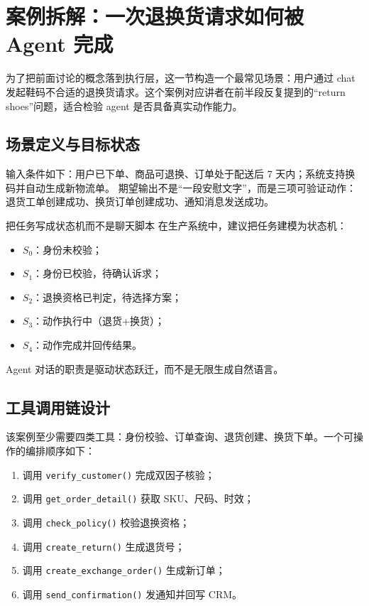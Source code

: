 \section{案例拆解：一次退换货请求如何被 Agent 完成}

为了把前面讨论的概念落到执行层，这一节构造一个最常见场景：用户通过 chat 发起鞋码不合适的退换货请求。这个案例对应讲者在前半段反复提到的“return shoes”问题，适合检验 agent 是否具备真实动作能力。

\subsection{场景定义与目标状态}

输入条件如下：用户已下单、商品可退换、订单处于配送后 7 天内；系统支持换码并自动生成新物流单。
期望输出不是“一段安慰文字”，而是三项可验证动作：退货工单创建成功、换货订单创建成功、通知消息发送成功。

\begin{knowledgebox}{把任务写成状态机而不是聊天脚本}
在生产系统中，建议把任务建模为状态机：
\begin{itemize}[leftmargin=1.5em]
    \item $S_0$：身份未校验；
    \item $S_1$：身份已校验，待确认诉求；
    \item $S_2$：退换资格已判定，待选择方案；
    \item $S_3$：动作执行中（退货+换货）；
    \item $S_4$：动作完成并回传结果。
\end{itemize}
Agent 对话的职责是驱动状态跃迁，而不是无限生成自然语言。
\end{knowledgebox}

\subsection{工具调用链设计}

该案例至少需要四类工具：身份校验、订单查询、退货创建、换货下单。一个可操作的编排顺序如下：
\begin{enumerate}[leftmargin=1.8em]
    \item 调用 \texttt{verify\_customer()} 完成双因子核验；
    \item 调用 \texttt{get\_order\_detail()} 获取 SKU、尺码、时效；
    \item 调用 \texttt{check\_policy()} 校验退换资格；
    \item 调用 \texttt{create\_return()} 生成退货号；
    \item 调用 \texttt{create\_exchange\_order()} 生成新订单；
    \item 调用 \texttt{send\_confirmation()} 发通知并回写 CRM。
\end{enumerate}

